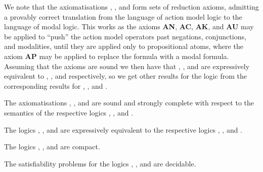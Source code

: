 We note that the axiomatisations \axiomAmlK{}, \axiomAmlKFF{}, and \axiomAmlS{} form sets of reduction axioms, admitting a provably correct translation from the language \langAml{} of action model logic to the language \langMl{} of modal logic.
This works as the axioms {\bf AN}, {\bf AC}, {\bf AK}, and {\bf AU} may be applied to ``push'' the action model operators past negations, conjunctions, and modalities, until they are applied only to propositional atoms, where the axiom {\bf AP} may be applied to replace the formula with a modal formula.
Assuming that the axioms are sound we then have that \logicAmlK{}, \logicAmlKFF{}, and \logicAmlS{} are expressively equivalent to \logicK{}, \logicKFF{}, and \logicS{} respectively, so we get other results for the logic from the corresponding results for \logicK{}, \logicKFF{}, and \logicS{}.

\begin{proposition}
The axiomatisations \axiomAmlK{}, \axiomAmlKFF{}, and \axiomAmlS{} are sound and strongly complete with respect to the semantics of the respective logics \logicAmlK{}, \logicAmlKFF{}, and \logicAmlS{}.
\end{proposition}

\begin{proposition}\label{aml-expressive-equivalence}
The logics \logicAmlK{}, \logicAmlKFF{}, and \logicAmlS{} are expressively equivalent to the respective logics \logicK{}, \logicKFF{}, and \logicS{}.
\end{proposition}

\begin{proposition}
The logics \logicAmlK{}, \logicAmlKFF{}, and \logicAmlS{} are compact.
\end{proposition}

\begin{proposition}
The satisfiability problems for the logics \logicAmlK{}, \logicAmlKFF{}, and \logicAmlS{} are decidable.
\end{proposition}
